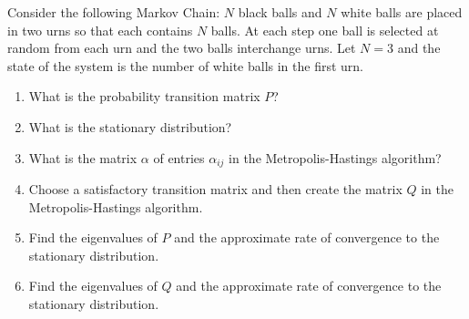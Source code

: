 \documentclass[12pt]{article}
\begin{document}
\begin{exercise}
    Consider the following Markov Chain:  \( N \) black balls and \( N \)
    white balls are placed in two urns so that each contains \( N \)
    balls.  At each step one ball is selected at random from each urn
    and the two balls interchange urns.  Let \( N = 3 \) and the state
    of the system is the number of white balls in the first urn.
    \begin{enumerate}[label=(\alph*)]
    \item
        What is the probability transition matrix \( P \)?
    \item
        What is the stationary distribution?
    \item
        What is the matrix \( \alpha \) of entries \( \alpha_{ij} \) in
        the Metropolis-Hastings algorithm?
    \item
        Choose a satisfactory transition matrix and then create the
        matrix \( Q \) in the Metropolis-Hastings algorithm.
    \item
        Find the eigenvalues of \( P \) and the approximate rate of
        convergence to the stationary distribution.
    \item
        Find the eigenvalues of \( Q \) and the approximate rate of
        convergence to the stationary distribution.
\end{enumerate}
\end{exercise}
\end{document}
